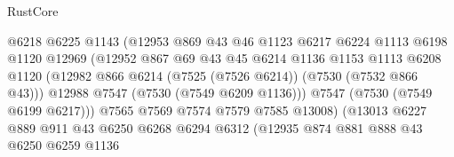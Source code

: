 \begin{lexlean}{RustCore}
\begin{coremodule}
                                    @6218
                                    @6225
                                    @1143
                                    (@12953
                                      @869
                                      @43
                                      @46
                                      @1123
                                      @6217
                                      @6224
                                      @1113
                                      @6198
                                      @1120
                                      @12969
                                      (@12952
                                        @867
                                        @69
                                        @43
                                        @45
                                        @6214
                                        @1136
                                        @1153
                                        @1113
                                        @6208
                                        @1120
                                        (@12982
                                          @866
                                          @6214
                                          (@7525 (@7526 @6214))
                                          (@7530 (@7532 @866 @43)))
                                        @12988
                                        @7547
                                        (@7530 (@7549 @6209 @1136)))
                                      @7547
                                      (@7530 (@7549 @6199 @6217)))
                                    @7565
                                    @7569
                                    @7574
                                    @7579
                                    @7585
                                    @13008)
                                  (@13013
                                    @6227
                                    @889
                                    @911
                                    @43
                                    @6250
                                    @6268
                                    @6294
                                    @6312
                                    (@12935
                                      @874
                                      @881
                                      @888
                                      @43
                                      @6250
                                      @6259
                                      @1136

\end{coremodule}
\end{lexlean}
